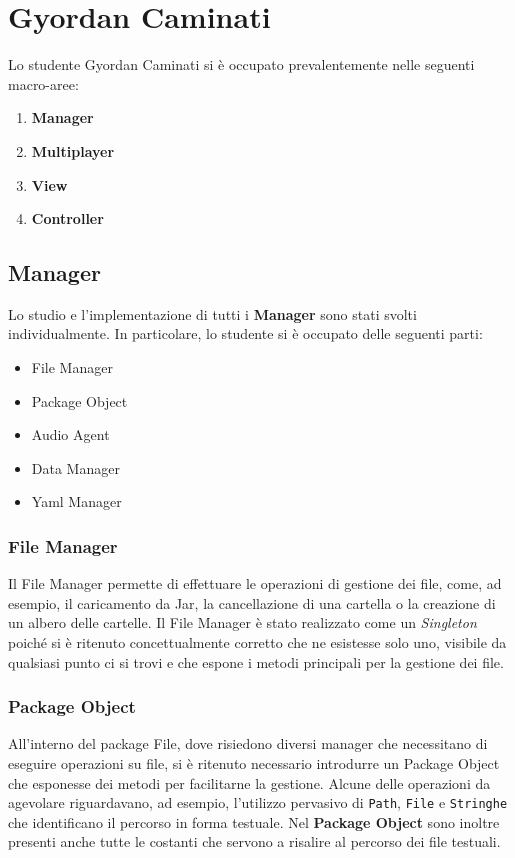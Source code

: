 \section{Gyordan Caminati}

Lo studente Gyordan Caminati si è occupato prevalentemente nelle seguenti macro-aree:

\begin{enumerate}
    \item \textbf{Manager}
    \item \textbf{Multiplayer}
    \item \textbf{View}
    \item \textbf{Controller}
\end{enumerate}

\subsection{Manager}
    Lo studio e l'implementazione di tutti i \textbf{Manager} sono stati svolti individualmente.
    In particolare, lo studente si è occupato delle seguenti parti:
    \begin{itemize}
        \item File Manager
        \item Package Object
	    \item Audio Agent
	    \item Data Manager
	    \item Yaml Manager
    \end{itemize}
    
    \subsubsection{File Manager}
    Il File Manager permette di effettuare le operazioni di gestione dei file, come, ad esempio, il caricamento da Jar, la cancellazione di una cartella o la creazione di un albero delle cartelle. Il File Manager è stato realizzato come un \textit{Singleton} poiché si è ritenuto concettualmente corretto che ne esistesse solo uno, visibile da qualsiasi punto ci si trovi e che espone i metodi principali per la gestione dei file.

    \subsubsection{Package Object}
    All'interno del package File, dove risiedono diversi manager che necessitano di eseguire operazioni su file, si è ritenuto necessario introdurre un Package Object che esponesse dei metodi per facilitarne la gestione. Alcune delle operazioni da agevolare riguardavano, ad esempio, l'utilizzo pervasivo di \texttt{Path}, \texttt{File} e \texttt{Stringhe} che identificano il percorso in forma testuale. Nel \textbf{Package Object} sono inoltre presenti anche tutte le costanti
    che servono a risalire al percorso dei file testuali.
    
